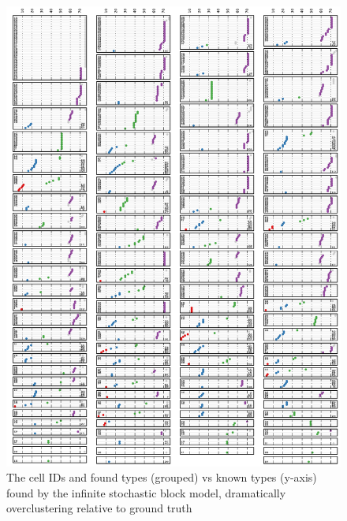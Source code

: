 \documentclass{article}
\begin{document}
\begin{figure}[h!]
  \centering 
    \centerline{\includegraphics[width=6.0in]{mouseretina/retina.1.2.bb.0.0.data-fixed_20_100-anneal_slow_400.truth_latent.pdf}}
  \caption{The cell IDs and found types (grouped) vs known types (y-axis)  found by the infinite stochastic block model, dramatically overclustering relative to ground truth}
\label{fig:supp:retinabbclusters}
\end{figure}
\end{document}
